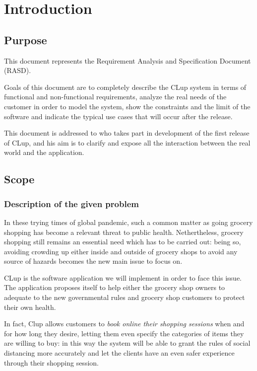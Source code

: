 \section{Introduction}
\label{sect:introduction}

\subsection{Purpose}
\label{subsect:purpose}

This document represents the Requirement Analysis and Specification Document (RASD). 

Goals of this document are to completely describe the CLup system in terms of functional and non-functional requirements, analyze the real needs of the customer in order to model the system, show the constraints and the limit of the software and indicate the typical use cases that will occur after the release. 

This document is addressed to who takes part in development of the first release of CLup, and his aim is to clarify and expose all the interaction between the real world and the application.

\subsection{Scope}
\label{subsect:scope}

\subsubsection{Description of the given problem}
\label{subsect:descriptionofthegivenproblem}

In these trying times of global pandemic, such a common matter as going grocery shopping has become a relevant threat to public health. 
Nethertheless, grocery shopping still remains an essential need which has to be carried out: being so, avoiding crowding up either inside and outside of grocery shops to avoid any source of hazards becomes the new main issue to focus on.

CLup is the software application we will implement in order to face this issue. The application proposes itself to help either the grocery shop owners to adequate to the new governmental rules and grocery shop customers to protect their own health.

In fact, Clup allows customers to \textit{book online their shopping sessions} when and for how long they desire, letting them even specify the categories of items they are willing to buy: in this way the system will be able to grant the rules of social distancing more accurately and let the clients have an even safer experience through their shopping session.

